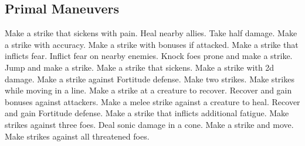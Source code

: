 \subsection{Primal Maneuvers}\label{Primal Maneuvers}
\begin{spelllist}
 Make a strike that sickens with pain.
 Heal nearby allies.
 Take half damage.
 Make a strike with  accuracy.
 Make a strike with bonuses if attacked.
 Make a strike that inflicts fear.
 Inflict fear on nearby enemies.
 Knock foes prone and make a strike.
 Jump and make a strike.
 Make a strike that sickens.
 Make a strike with \plus2d damage.
 Make a strike against Fortitude defense.
 Make two strikes.
 Make strikes while moving in a line.
 Make a strike at a creature to recover.
 Recover and gain bonuses against attackers.
 Make a melee strike against a creature to heal.
 Recover and gain  Fortitude defense.
 Make a strike that inflicts additional fatigue.
 Make strikes against three foes.
 Deal sonic damage in a cone.
 Make a strike and move.
 Make strikes against all threatened foes.
\end{spelllist}



\small
